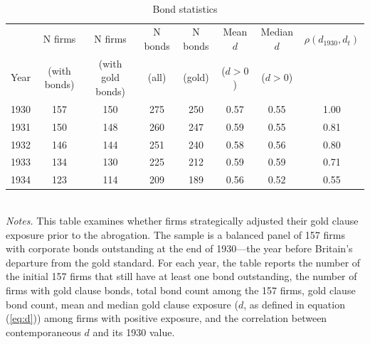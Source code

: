 \begin{table}[p]
    \centering
    \caption{\\ Bond statistics}
    \scriptsize
    \label{tab:bond_stats}
    
    \begin{threeparttable}
        \begin{tabular}{lccccccc}
            \toprule
                 & N firms & N firms & N bonds & N bonds & Mean $d$ & Median $d$ & $\rho(d_{1930}, d_t)$ \\
            Year & (with bonds) & (with gold bonds) & (all) & (gold) & ($d>0$) & ($d>0$) & \\
            \midrule
            1930 & 157 & 150 & 275 & 250 & 0.57 & 0.55 & 1.00 \\
            1931 & 150 & 148 & 260 & 247 & 0.59 & 0.55 & 0.81 \\
            1932 & 146 & 144 & 251 & 240 & 0.58 & 0.56 & 0.80 \\
            1933 & 134 & 130 & 225 & 212 & 0.59 & 0.59 & 0.71 \\
            1934 & 123 & 114 & 209 & 189 & 0.56 & 0.52 & 0.55 \\
            \bottomrule
        \end{tabular}
    \end{threeparttable}\\
    
    \vspace*{3mm} \justifying \noindent
    \scriptsize{\textit{Notes.} This table examines whether firms strategically adjusted their gold clause exposure prior to the abrogation. The sample is a balanced panel of 157 firms with corporate bonds outstanding at the end of 1930---the year before Britain's departure from the gold standard. For each year, the table reports the number of the initial 157 firms that still have at least one bond outstanding, the number of firms with gold clause bonds, total bond count among the 157 firms, gold clause bond count, mean and median gold clause exposure ($d$, as defined in equation (\ref{eq:d})) among firms with positive exposure, and the correlation between contemporaneous $d$ and its 1930 value.}
\end{table}